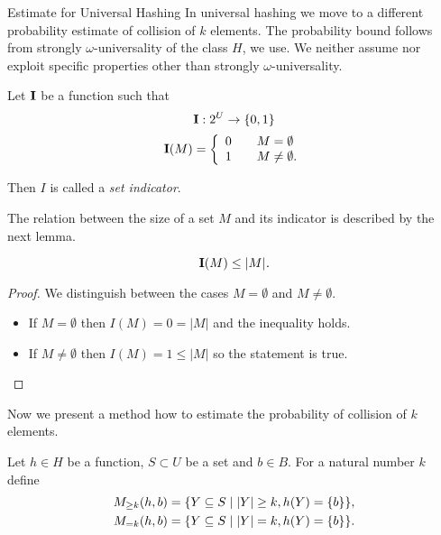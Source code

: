 \begin{section}{Estimate for Universal Hashing}
In universal hashing we move to a different probability estimate of collision of $k$ elements. The probability bound follows from strongly $\omega$-universality of the class $H$, we use. We neither assume nor exploit specific properties other than strongly $\omega$-universality.
\begin{definition}
Let $\mathbf{I}$ be a function such that
\begin{displaymath}
\mathbf{I}: 2^U \rightarrow \lbrace 0, 1 \rbrace
\end{displaymath}
\begin{displaymath}
\mathbf{I}(M) = \left\{ 
\begin{array}{l l}
  0 & \quad M = \emptyset \\
  1 & \quad M \neq \emptyset \text{.} \\
\end{array} \right. 
\end{displaymath}

Then $I$ is called a \emph{set indicator}.
\end{definition}

The relation between the size of a set $M$ and its indicator is described by the next lemma.
\begin{lemma}
\[\mathbf{I}(M) \leq |M| \textit{.} \]
\end{lemma}
\begin{proof} We distinguish between the cases $M = \emptyset$ and $M \neq \emptyset$.
\begin{itemize}
\item If $M = \emptyset$ then $I(M) = 0 = |M|$ and the inequality holds. 
\item If $M \neq \emptyset$ then $I(M) = 1 \leq |M|$ so the statement is true.
\end{itemize}
\end{proof}

Now we present a method how to estimate the probability of collision of $k$ elements.
\begin{definition}
Let $h \in H$ be a function, $S \subset U$ be a set and $b \in B$. For a natural number $k$ define
\[
\begin{split}
M_{\geq k}(h, b) & = \{Y \subseteq S \mid |Y| \geq k, h(Y) = \{b\}\}, \\
M_{= k}(h, b) & = \{Y \subseteq S \mid |Y| = k, h(Y) = \{b\}\}  \text{.}
\end{split}
\]
\end{definition}


\end{section}
